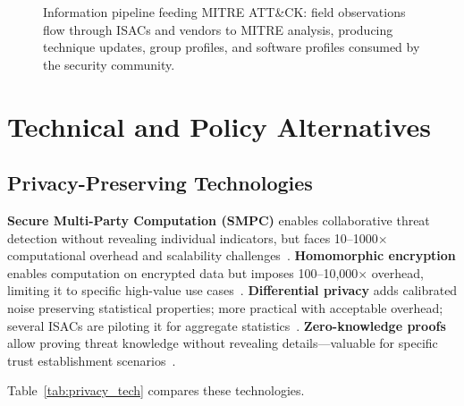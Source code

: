 \documentclass[journal]{IEEEtran}
\begin{document}
\begin{figure}[!t]
\caption{Information pipeline feeding MITRE ATT\&CK: field observations flow through ISACs and vendors to MITRE analysis, producing technique updates, group profiles, and software profiles consumed by the security community.}
\label{fig:attack_pipeline}
\end{figure}

\section{Technical and Policy Alternatives}

\subsection{Privacy-Preserving Technologies}

\textbf{Secure Multi-Party Computation (SMPC)} enables collaborative threat detection without revealing individual indicators, but faces 10--1000$\times$ computational overhead and scalability challenges~\cite{yao2024smpc}. \textbf{Homomorphic encryption} enables computation on encrypted data but imposes 100--10,000$\times$ overhead, limiting it to specific high-value use cases~\cite{gentry2024homomorphic}. \textbf{Differential privacy} adds calibrated noise preserving statistical properties; more practical with acceptable overhead; several ISACs are piloting it for aggregate statistics~\cite{fsisac2024privacy}. \textbf{Zero-knowledge proofs} allow proving threat knowledge without revealing details---valuable for specific trust establishment scenarios~\cite{goldwasser2024knowledge}.

Table~\ref{tab:privacy_tech} compares these technologies.
\end{document}
